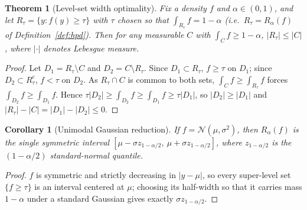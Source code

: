 \documentclass[10pt,twocolumn,a4paper]{article}
\newtheorem{theorem}{Theorem}
\newtheorem{corollary}{Corollary}
\begin{document}
\begin{theorem}[Level-set width optimality]
\label{thm:hpd}
Fix a density $f$ and $\alpha \in (0,1)$, and let $R_\tau = \{y : f(y)\ge \tau\}$ with $\tau$ chosen so
that $\int_{R_\tau} f = 1-\alpha$ (i.e.\ $R_\tau = R_\alpha(f)$ of Definition~\ref{def:hpd}). Then for
any measurable $C$ with $\int_C f \ge 1-\alpha$, $|R_\tau| \le |C|$, where $|\cdot|$ denotes Lebesgue
measure.
\end{theorem}
\begin{proof}
Let $D_1 = R_\tau\setminus C$ and $D_2 = C\setminus R_\tau$. Since $D_1\subset R_\tau$, $f\ge\tau$ on
$D_1$; since $D_2\subset R_\tau^c$, $f<\tau$ on $D_2$. As $R_\tau\cap C$ is common to both sets,
$\int_C f\ge\int_{R_\tau}f$ forces $\int_{D_2}f\ge\int_{D_1}f$. Hence
$\tau|D_2|\ge\int_{D_2}f\ge\int_{D_1}f\ge\tau|D_1|$, so $|D_2|\ge|D_1|$ and
$|R_\tau|-|C| = |D_1|-|D_2|\le 0$.
\end{proof}

\begin{corollary}[Unimodal Gaussian reduction]
\label{cor:gaussian-hpd}
If $f = \mathcal N(\mu,\sigma^2)$, then $R_\alpha(f)$ is the single symmetric interval
$[\mu - \sigma z_{1-\alpha/2},\ \mu + \sigma z_{1-\alpha/2}]$, where $z_{1-\alpha/2}$ is the
$(1-\alpha/2)$ standard-normal quantile.
\end{corollary}
\begin{proof}
$f$ is symmetric and strictly decreasing in $|y-\mu|$, so every super-level set $\{f\ge\tau\}$ is an
interval centered at $\mu$; choosing its half-width so that it carries mass $1-\alpha$ under a
standard Gaussian gives exactly $\sigma z_{1-\alpha/2}$.
\end{proof}
\end{document}
